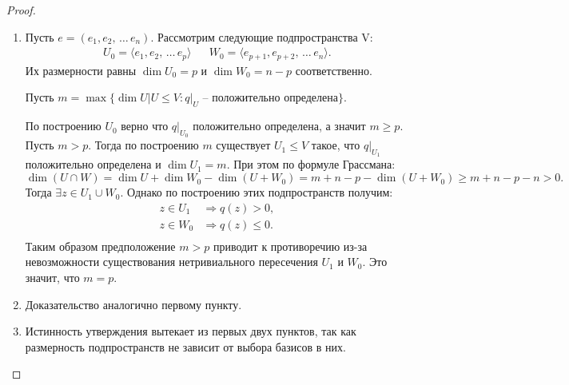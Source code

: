 \begin{proof}~
    \begin{enumerate}
        \item Пусть $e = (e_1, e_2, \, \dots \,e_n)$. Рассмотрим следующие подпространства V:
        \begin{align*}
            U_0 = \langle e_1, e_2, \, \dots \,e_p \rangle && W_0 = \langle e_{p+1}, e_{p+2}, \, \dots \,e_n\rangle. 
        \end{align*}
        Их размерности равны $\dim U_0 = p$ и $\dim W_0 = n-p$ соответственно.

        Пусть $m = \max \{ \dim U \vert U \leq V: q\vert_U \text{ -- положительно определена}\}$.

        По построению $U_0$ верно что $q \vert_{U_0}$ положительно определена, а значит $m \geq p$. Пусть $m > p$.
        Тогда по построению $m$ существует $U_1  \leq V$ такое, что $q \vert_{U_1}$ положительно определена
        и $\dim U_1 = m$.
        При этом по формуле Грассмана: 
        $$\dim (U \cap W) = \dim U + \dim W_0  - \dim (U + W_0) = m + n - p - \dim (U + W_0) \geq 
        m + n - p - n > 0.$$
        Тогда $\exists z \in U_1 \cup W_0$. Однако по построению этих подпространств получим:
        \begin{align*}
            z \in U_1 \, & \Rightarrow q(z) > 0, \\
            z \in W_0 & \Rightarrow q(z) \leq 0. \\
        \end{align*}
        Таким образом предположение $m > p$ приводит к противоречию из-за невозможности существования 
        нетривиального пересечения $U_1$ и $W_0$. Это значит, что $m = p$. 

        \item Доказательство аналогично первому пункту.
        \item Истинность утверждения вытекает из первых двух пунктов, так как размерность подпространств 
        не зависит от выбора базисов в них.
    \end{enumerate}
\end{proof}

